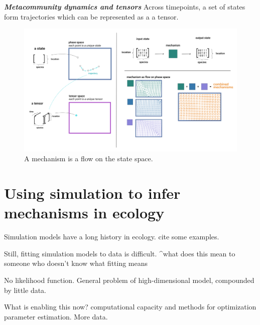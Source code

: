 \documentclass[11pt]{article}
\makeatletter
\def\maxwidth{\ifdim\Gin@nat@width>\linewidth\linewidth
\else\Gin@nat@width\fi}
\let\Oldincludegraphics\includegraphics
\renewcommand{\includegraphics}[1]{\Oldincludegraphics[width=\maxwidth]{#1}}
\makeatother
\begin{document}
\textbf{\emph{Metacommunity dynamics and tensors}} Across timepoints, a
set of states form trajectories which can be represented as a a tensor.

\begin{figure}
\hypertarget{fig:flow}{%
\centering
\includegraphics{./figures/flows.png}
\caption{A mechanism is a flow on the state space.}\label{fig:flow}
}
\end{figure}

\hypertarget{using-simulation-to-infer-mechanisms-in-ecology}{%
\section{Using simulation to infer mechanisms in
ecology}\label{using-simulation-to-infer-mechanisms-in-ecology}}

Simulation models have a long history in ecology. cite some examples.

Still, fitting simulation models to data is difficult. \^{}what does
this mean to someone who doesn't know what fitting means

No likelihood function. General problem of high-dimensional model,
compounded by little data.

What is enabling this now? computational capacity and methods for
optimization parameter estimation. More data.
\end{document}

